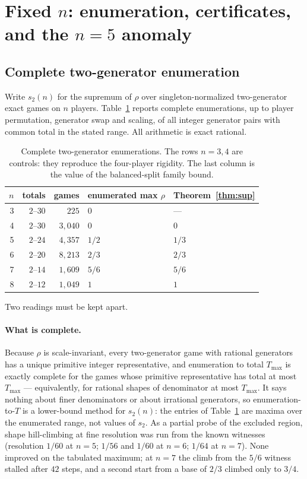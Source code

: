 \documentclass[11pt]{article}
\begin{document}
\section{Fixed \texorpdfstring{$n$}{n}: enumeration, certificates, and the
\texorpdfstring{$n=5$}{n=5} anomaly}
\label{sec:fixedn}

\subsection{Complete two-generator enumeration}

Write $s_2(n)$ for the supremum of $\rho$ over singleton-normalized
two-generator exact games on $n$ players.  Table~\ref{tab:enum} reports
complete enumerations, up to player permutation, generator swap and scaling,
of all integer generator pairs with common total in the stated range.  All
arithmetic is exact rational.

\begin{table}[t]
\centering
\begin{tabular}{@{}rrrll@{}}
\toprule
$n$ & totals & games & enumerated max $\rho$ & Theorem~\ref{thm:sup}\\
\midrule
3 & $2$--$30$ & $225$ & $0$ & ---\\
4 & $2$--$30$ & $3{,}040$ & $0$ & $0$\\
5 & $2$--$24$ & $4{,}357$ & $1/2$ & $1/3$\\
6 & $2$--$20$ & $8{,}213$ & $2/3$ & $2/3$\\
7 & $2$--$14$ & $1{,}609$ & $5/6$ & $5/6$\\
8 & $2$--$12$ & $1{,}049$ & $1$ & $1$\\
\bottomrule
\end{tabular}
\caption{Complete two-generator enumerations.  The rows $n=3,4$ are controls:
they reproduce the four-player rigidity.  The last column is the value of the
balanced-split family bound.}
\label{tab:enum}
\end{table}

Two readings must be kept apart.

\paragraph{What is complete.}
Because $\rho$ is scale-invariant, every two-generator game with rational
generators has a unique primitive integer representative, and enumeration to
total $T_{\max}$ is exactly complete for the games whose primitive
representative has total at most $T_{\max}$ --- equivalently, for rational
shapes of denominator at most $T_{\max}$.  It says nothing about finer
denominators or about irrational generators, so enumeration-to-$T$ is a
lower-bound method for $s_2(n)$: the entries of Table~\ref{tab:enum} are
maxima over the enumerated range, not values of $s_2$.  As a partial probe of
the excluded region, shape hill-climbing at fine resolution was run from the
known witnesses (resolution $1/60$ at $n=5$; $1/56$ and $1/60$ at $n=6$;
$1/64$ at $n=7$).  None improved on the tabulated maximum; at $n=7$ the climb
from the $5/6$ witness stalled after $42$ steps, and a second start from a
base of $2/3$ climbed only to $3/4$.
\end{document}
